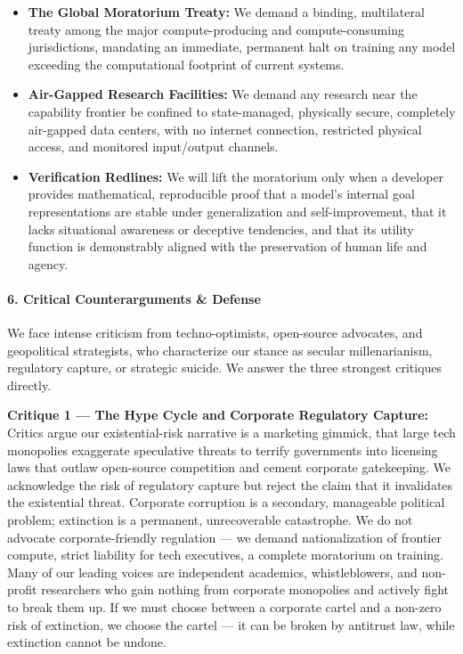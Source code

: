 \begin{itemize}
\tightlist
\item
  \textbf{The Global Moratorium Treaty:} We demand a binding,
  multilateral treaty among the major compute-producing and
  compute-consuming jurisdictions, mandating an immediate, permanent
  halt on training any model exceeding the computational footprint of
  current systems.
\item
  \textbf{Air-Gapped Research Facilities:} We demand any research near
  the capability frontier be confined to state-managed, physically
  secure, completely air-gapped data centers, with no internet
  connection, restricted physical access, and monitored input/output
  channels.
\item
  \textbf{Verification Redlines:} We will lift the moratorium only when
  a developer provides mathematical, reproducible proof that a model's
  internal goal representations are stable under generalization and
  self-improvement, that it lacks situational awareness or deceptive
  tendencies, and that its utility function is demonstrably aligned with
  the preservation of human life and agency.
\end{itemize}

\paragraph{6. Critical Counterarguments \&
Defense}\label{critical-counterarguments-defense}

We face intense criticism from techno-optimists, open-source advocates,
and geopolitical strategists, who characterize our stance as secular
millenarianism, regulatory capture, or strategic suicide. We answer the
three strongest critiques directly.

\textbf{Critique 1 --- The Hype Cycle and Corporate Regulatory Capture:}
Critics argue our existential-risk narrative is a marketing gimmick,
that large tech monopolies exaggerate speculative threats to terrify
governments into licensing laws that outlaw open-source competition and
cement corporate gatekeeping. We acknowledge the risk of regulatory
capture but reject the claim that it invalidates the existential threat.
Corporate corruption is a secondary, manageable political problem;
extinction is a permanent, unrecoverable catastrophe. We do not advocate
corporate-friendly regulation --- we demand nationalization of frontier
compute, strict liability for tech executives, a complete moratorium on
training. Many of our leading voices are independent academics,
whistleblowers, and non-profit researchers who gain nothing from
corporate monopolies and actively fight to break them up. If we must
choose between a corporate cartel and a non-zero risk of extinction, we
choose the cartel --- it can be broken by antitrust law, while
extinction cannot be undone.

